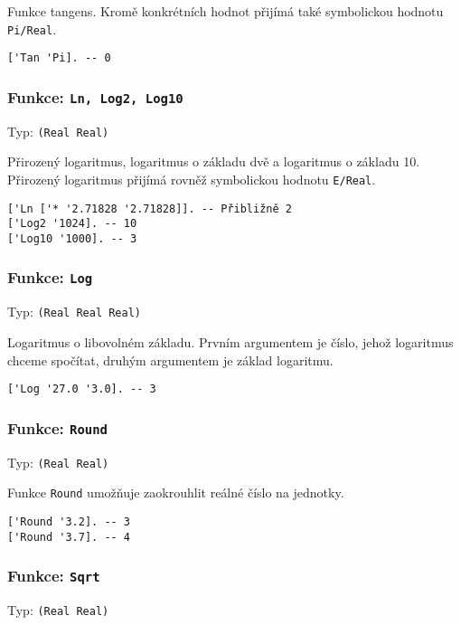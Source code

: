 Funkce tangens. Kromě konkrétních hodnot přijímá také symbolickou hodnotu \lstinline{Pi/Real}.

\begin{lstlisting}[caption={Ukázka využití Tan}]
['Tan 'Pi]. -- 0
\end{lstlisting}

\subsubsection*{Funkce: \lstinline{Ln, Log2, Log10}}
Typ: \lstinline{(Real Real)}

Přirozený logaritmus, logaritmus o základu dvě a logaritmus o základu 10. Přirozený logaritmus
přijímá rovněž symbolickou hodnotu \lstinline{E/Real}.

\begin{lstlisting}[caption={Ukázka využití Ln, Log2, Log10}]
['Ln ['* '2.71828 '2.71828]]. -- Přibližně 2
['Log2 '1024]. -- 10
['Log10 '1000]. -- 3
\end{lstlisting}

\subsubsection*{Funkce: \lstinline{Log}}
Typ: \lstinline{(Real Real Real)}

Logaritmus o libovolném základu. Prvním argumentem je číslo, jehož logaritmus chceme spočítat,
druhým argumentem je základ logaritmu.

\begin{lstlisting}[caption={Ukázka využití Log}]
['Log '27.0 '3.0]. -- 3
\end{lstlisting}

\subsubsection*{Funkce: \lstinline{Round}}
Typ: \lstinline{(Real Real)}

Funkce \lstinline{Round} umožňuje zaokrouhlit reálné číslo na jednotky.

\begin{lstlisting}[caption={Ukázka využití Round}]
['Round '3.2]. -- 3
['Round '3.7]. -- 4
\end{lstlisting}

\subsubsection*{Funkce: \lstinline{Sqrt}}
Typ: \lstinline{(Real Real)}

